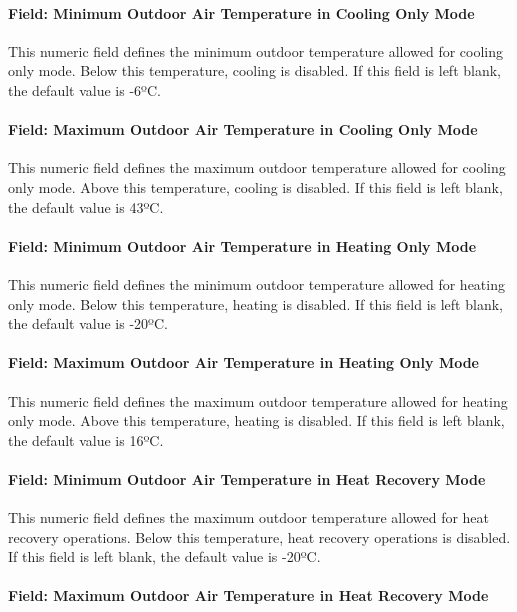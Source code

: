 \paragraph{Field: Minimum Outdoor Air Temperature in Cooling Only Mode}

This numeric field defines the minimum outdoor temperature allowed for cooling only mode. Below this temperature, cooling is disabled. If this field is left blank, the default value is -6ºC.

\paragraph{Field: Maximum Outdoor Air Temperature in Cooling Only Mode}

This numeric field defines the maximum outdoor temperature allowed for cooling only mode. Above this temperature, cooling is disabled. If this field is left blank, the default value is 43ºC.

\paragraph{Field: Minimum Outdoor Air Temperature in Heating Only Mode}

This numeric field defines the minimum outdoor temperature allowed for heating only mode. Below this temperature, heating is disabled. If this field is left blank, the default value is -20ºC.

\paragraph{Field: Maximum Outdoor Air Temperature in Heating Only Mode}

This numeric field defines the maximum outdoor temperature allowed for heating only mode. Above this temperature, heating is disabled. If this field is left blank, the default value is 16ºC.

\paragraph{Field: Minimum Outdoor Air Temperature in Heat Recovery Mode}

This numeric field defines the maximum outdoor temperature allowed for heat recovery operations. Below this temperature, heat recovery operations is disabled. If this field is left blank, the default value is -20ºC.

\paragraph{Field: Maximum Outdoor Air Temperature in Heat Recovery Mode}

